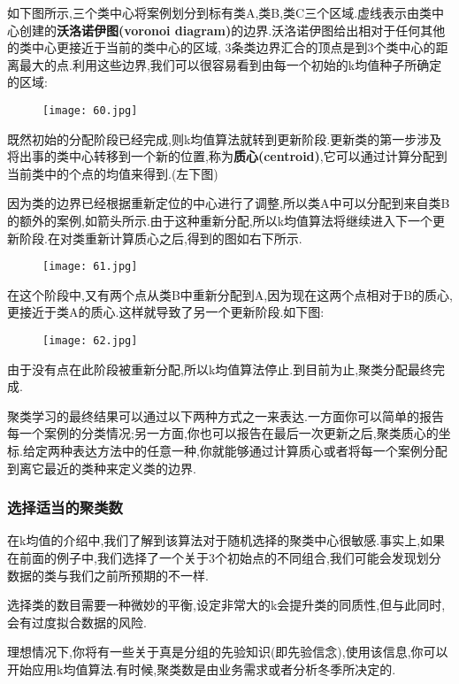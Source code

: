 \documentclass[11pt,a4paper,oneside]{book}
\begin{document}
如下图所示,三个类中心将案例划分到标有类A,类B,类C三个区域.虚线表示由类中心创建的\textbf{沃洛诺伊图(voronoi diagram)}的边界.沃洛诺伊图给出相对于任何其他的类中心更接近于当前的类中心的区域, 3条类边界汇合的顶点是到3个类中心的距离最大的点.利用这些边界,我们可以很容易看到由每一个初始的k均值种子所确定的区域:
\begin{figure}[H]
	\centering
	\texttt{[image: 60.jpg]}
\end{figure}

既然初始的分配阶段已经完成,则k均值算法就转到更新阶段.更新类的第一步涉及将出事的类中心转移到一个新的位置,称为\textbf{质心(centroid)},它可以通过计算分配到当前类中的个点的均值来得到.(左下图)

因为类的边界已经根据重新定位的中心进行了调整,所以类A中可以分配到来自类B的额外的案例,如箭头所示.由于这种重新分配,所以k均值算法将继续进入下一个更新阶段.在对类重新计算质心之后,得到的图如右下所示.
\begin{figure}[H]
	\centering
	\texttt{[image: 61.jpg]}
\end{figure}

在这个阶段中,又有两个点从类B中重新分配到A,因为现在这两个点相对于B的质心,更接近于类A的质心.这样就导致了另一个更新阶段.如下图:
\begin{figure}[H]
	\centering
	\texttt{[image: 62.jpg]}
\end{figure}

由于没有点在此阶段被重新分配,所以k均值算法停止.到目前为止,聚类分配最终完成.

聚类学习的最终结果可以通过以下两种方式之一来表达.一方面你可以简单的报告每一个案例的分类情况;另一方面,你也可以报告在最后一次更新之后,聚类质心的坐标.给定两种表达方法中的任意一种,你就能够通过计算质心或者将每一个案例分配到离它最近的类种来定义类的边界.

\subsubsection{选择适当的聚类数}
在k均值的介绍中,我们了解到该算法对于随机选择的聚类中心很敏感.事实上,如果在前面的例子中,我们选择了一个关于3个初始点的不同组合,我们可能会发现划分数据的类与我们之前所预期的不一样.

\begin{tcolorbox}[colback=pink!10!white,colframe=pink!100!black]
选择类的数目需要一种微妙的平衡,设定非常大的k会提升类的同质性,但与此同时,会有过度拟合数据的风险.
\end{tcolorbox}

理想情况下,你将有一些关于真是分组的先验知识(即先验信念),使用该信息,你可以开始应用k均值算法.有时候,聚类数是由业务需求或者分析冬季所决定的.
\end{document}
